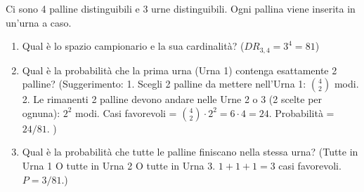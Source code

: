 \begin{exercise}
Ci sono 4 palline distinguibili e 3 urne distinguibili. Ogni pallina viene inserita in un'urna a caso.
\begin{enumerate}
    \item Qual è lo spazio campionario e la sua cardinalità? ($DR_{3,4} = 3^4=81$)
    \item Qual è la probabilità che la prima urna (Urna 1) contenga esattamente 2 palline?
    (Suggerimento:
    1. Scegli 2 palline da mettere nell'Urna 1: $\binom{4}{2}$ modi.
    2. Le rimanenti 2 palline devono andare nelle Urne 2 o 3 (2 scelte per ognuna): $2^2$ modi.
    Casi favorevoli = $\binom{4}{2} \cdot 2^2 = 6 \cdot 4 = 24$. Probabilità = $24/81$.
    )
    \item Qual è la probabilità che tutte le palline finiscano nella stessa urna?
    (Tutte in Urna 1 O tutte in Urna 2 O tutte in Urna 3. $1+1+1 = 3$ casi favorevoli. $P=3/81$.)
\end{enumerate}
\end{exercise}

